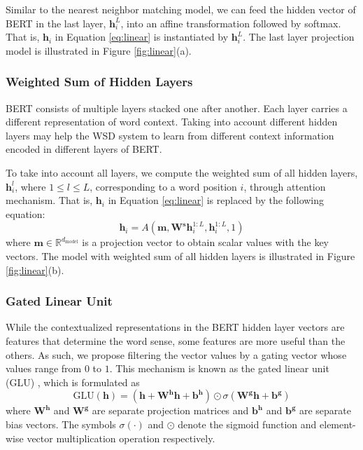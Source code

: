 \documentclass[11pt,a4paper]{article}
\begin{document}
Similar to the nearest neighbor matching model, we can feed the hidden vector of BERT in the last layer, $\mathbf{h}^L_i$, into an affine transformation followed by softmax. That is, $\mathbf{h}_i$ in Equation \ref{eq:linear} is instantiated by $\mathbf{h}^L_i$. The last layer projection model is illustrated in Figure \ref{fig:linear}(a).

\subsubsection{Weighted Sum of Hidden Layers}
\label{sec:incorporating_linear_lw}

BERT consists of multiple layers stacked one after another. Each layer carries a different representation of word context. Taking into account different hidden layers may help the WSD system to learn from different context information encoded in different layers of BERT.

To take into account all layers, we compute the weighted sum of all hidden layers, $\mathbf{h}^l_i$, where $1 \le l \le L$, corresponding to a word position $i$, through attention mechanism. That is, $\mathbf{h}_i$ in Equation \ref{eq:linear} is replaced by the following equation:
\begin{equation}
    \mathbf{h}_i = A(\mathbf{m}, \mathbf{W}^\mathbf{s} \mathbf{h}^{1:L}_i, \mathbf{h}^{1:L}_i, 1)
\end{equation}
where $\mathbf{m} \in \mathbb{R}^{d_\text{model}}$ is a projection vector to obtain scalar values with the key vectors. The model with weighted sum of all hidden layers is illustrated in Figure \ref{fig:linear}(b).

\subsubsection{Gated Linear Unit}
\label{sec:incorporating_linear_glu}

While the contextualized representations in the BERT hidden layer vectors are features that determine the word sense, some features are more useful than the others. As such, we propose filtering the vector values by a gating vector whose values range from $0$ to $1$. This mechanism is known as the gated linear unit (GLU) \cite{dauphin_language_2017}, which is formulated as
\begin{equation}
    \text{GLU}(\mathbf{h}) = (\mathbf{h} + \mathbf{W}^\mathbf{h}\mathbf{h} + \mathbf{b}^\mathbf{h}) \odot \sigma(\mathbf{W}^\mathbf{g}\mathbf{h} + \mathbf{b}^\mathbf{g})
\end{equation}
where $\mathbf{W}^\mathbf{h}$ and $\mathbf{W}^\mathbf{g}$ are separate projection matrices and $\mathbf{b}^\mathbf{h}$ and $\mathbf{b}^\mathbf{g}$ are separate bias vectors. The symbols $\sigma(\cdot)$ and $\odot$ denote the sigmoid function and element-wise vector multiplication operation respectively.
\end{document}
